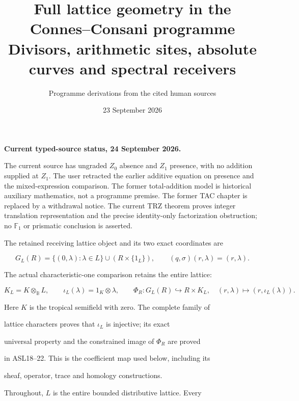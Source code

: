 \documentclass[11pt]{article}
\title{Full lattice geometry in the Connes--Consani programme\\
Divisors, arithmetic sites, absolute curves and spectral receivers}
\author{Programme derivations from the cited human sources}
\date{23 September 2026}
\theoremstyle{definition}
\begin{document}
\noindent\textbf{Current typed-source status, 24 September 2026.}

The current source has ungraded $Z_0$ absence and $Z_1$ presence, with no addition supplied at $Z_1$. The user retracted the earlier additive equation on presence and the mixed-expression comparison. The former total-addition model is historical auxiliary mathematics, not a programme premise. The former TAC chapter is replaced by a withdrawal notice. The current TRZ theorem proves integer translation representation and the precise identity-only factorization obstruction; no $\mathbb F_1$ or prismatic conclusion is asserted.

\par\medskip





\maketitle



The retained receiving lattice object and its two exact coordinates are



\[
G_L(R)=\{(0,\lambda):\lambda\in L\}\cup(R\times\{1_L\}),
\qquad(q,\sigma)(r,\lambda)=(r,\lambda).
\]



The actual characteristic-one comparison retains the entire lattice:



\[
K_L=K\otimes_{\mathbb B}L,\qquad
\iota_L(\lambda)=1_K\otimes\lambda,\qquad
\Phi_R:G_L(R)\hookrightarrow R\times K_L,\quad
(r,\lambda)\longmapsto(r,\iota_L(\lambda)).
\]



Here $K$ is the tropical semifield with zero. The complete family of



lattice characters proves that $\iota_L$ is injective; its exact



universal property and the constrained image of $\Phi_R$ are proved



in ASL18--22. This is the coefficient map used below, including its



sheaf, operator, trace and homology constructions.



Throughout, $L$ is the entire bounded distributive lattice. Every
\end{document}
